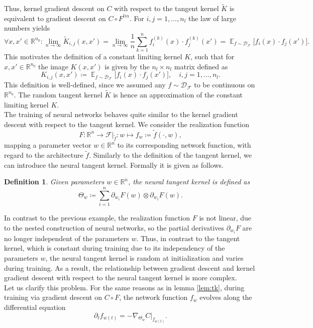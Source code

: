 \documentclass[11pt, a4paper]{article}
\newtheorem{definition}[theorem]{Definition}
\newcommand{\R}{\mathbb{R}}
\newcommand{\D}{\mathcal{D}}
\newcommand{\F}{\mathcal{F}}
\DeclareMathOperator*{\E}{\mathbb{E}}
\begin{document}
Thus, kernel gradient descent on $C$ with respect to the tangent kernel $\tilde{K}$ is equivalent to gradient descent on $C \circ F^\textit{lin}$. For $i,j = 1, \dots, n_l$ the law of large numbers yields
\[ \forall x,x' \in \R^{n_0} : \lim_{n \to \infty} \tilde{K}_{i,j}(x,x') = \lim_{n \to \infty} \frac{1}{n} \sum_{k=1}^{n} f_i^{(k)}(x) \cdot f_j^{(k)}(x') = \E_{f \sim \D_{\F}} \Big [ f_i(x) \cdot f_j(x') \Big ]. \]
This motivates the definition of a constant limiting kernel $K$, such that for $x,x' \in \R^{n_0}$ the image $K(x,x')$ is given by the $n_l \times n_l$ matrix defined as
\[ K_{i,j}(x,x') \coloneq \E_{f \sim \D_{\F}} \Big [ f_i(x) \cdot f_j(x') \Big ], \quad i,j=1,\dots,n_l. \]
This definition is well-defined, since we assumed any $f \sim \D_\F$ to be continuous on $\R^{n_0}$. The random tangent kernel $\tilde{K}$ is hence an approximation of the constant limiting kernel $K$. \\

The training of neural networks behaves quite similar to the kernel gradient descent with respect to the tangent kernel. We consider the realization function
\[ F: \R^n \to \F|_{\tilde{f}} : w \mapsto f_w \coloneq \tilde{f}(\cdot,w), \]
 mapping a parameter vector $w \in \R^n$ to its corresponding network function, with regard to the architecture $\tilde{f}$. Similarly to the definition of the tangent kernel, we can introduce the neural tangent kernel. Formally it is given as follows.
 
\begin{definition} \label{def:ntk}
Given parameters $w \in \R^n$, the neural tangent kernel is defined as
\[ \Theta_w \coloneq \sum_{i=1}^{n} \partial_{w_i} F(w) \otimes \partial_{w_i} F(w). \]
\end{definition}

In contrast to the previous example, the realization function $F$ is not linear, due to the nested construction of neural networks, so the partial derivatives $\partial_{w_i}F$ are no longer independent of the parameters $w$. Thus, in contrast to the tangent kernel, which is constant during training due to its independency of the parameters $w$, the neural tangent kernel is random at initialization and varies during training. As a result, the relationship between gradient descent and kernel gradient descent with respect to the neural tangent kernel is more complex. \\

Let us clarify this problem. For the same reasons as in lemma \ref{lem:tk}, during training via gradient descent on $C \circ F$, the network function $f_w$ evolves along the differential equation
\[ \partial_tf_{w(t)} = -\nabla_{\Theta_w}C|_{f_{w(t)}}. \]
\end{document}
